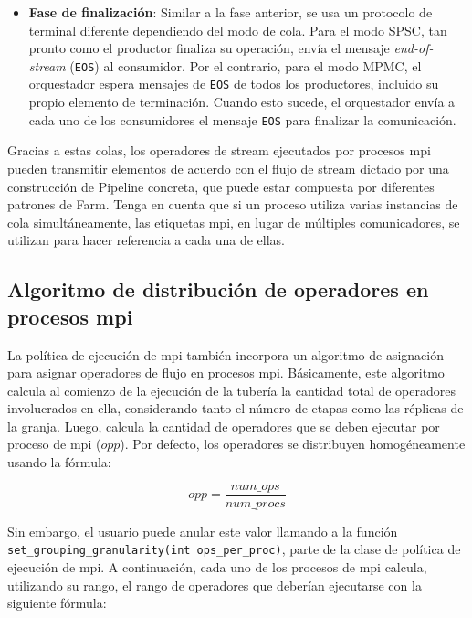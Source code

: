 \begin{itemize}
\item \textbf{Fase de finalización}: Similar a la fase anterior, se usa un protocolo de terminal diferente dependiendo del modo de cola. Para el modo SPSC, tan pronto como el productor finaliza su operación, envía el mensaje \emph{end-of-stream} (\texttt{EOS}) al consumidor. Por el contrario, para el modo MPMC, el orquestador espera mensajes de \texttt{EOS} de todos los productores, incluido su propio elemento de terminación. Cuando esto sucede, el orquestador envía a cada uno de los consumidores el mensaje \texttt{EOS} para finalizar la comunicación.
\end{itemize}

Gracias a estas colas, los operadores de stream ejecutados por procesos \acrshort{mpi} pueden transmitir elementos de acuerdo con el flujo de stream dictado por una construcción de Pipeline concreta, que puede estar compuesta por diferentes patrones de Farm. Tenga en cuenta que si un proceso utiliza varias instancias de cola simultáneamente, las etiquetas \acrshort{mpi}, en lugar de múltiples comunicadores, se utilizan para hacer referencia a cada una de ellas.

\subsection{Algoritmo de distribución de operadores en procesos \acrshort{mpi}}
\label{sec:algoritmo_distribucion_mpi}

La política de ejecución de \acrshort{mpi} también incorpora un algoritmo de asignación para asignar operadores de flujo en procesos \acrshort{mpi}. Básicamente, este algoritmo calcula al comienzo de la ejecución de la tubería la cantidad total de operadores involucrados en ella, considerando tanto el número de etapas como las réplicas de la granja. Luego, calcula la cantidad de operadores que se deben ejecutar por proceso de \acrshort{mpi} ($opp$). Por defecto, los operadores se distribuyen homogéneamente usando la fórmula:

\vspace{0.35cm}
\begin{equation}\label{eq:opp}
opp= \frac{num\_ops}{num\_procs}
\end{equation}
\vspace{0.35cm}

Sin embargo, el usuario puede anular este valor llamando a la función \texttt{set\_grouping\_granularity(int ops\_per\_proc)}, parte de la clase de política de ejecución de \acrshort{mpi}. A continuación, cada uno de los procesos de \acrshort{mpi} calcula, utilizando su rango, el rango de operadores que deberían ejecutarse con la siguiente fórmula:

